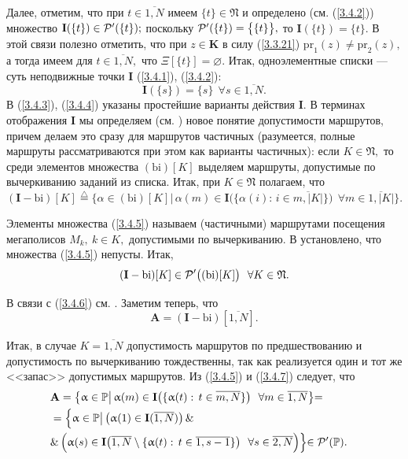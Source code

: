 \documentclass[11pt,twoside,openany]{report}
\newcommand{\bfn}{\begin{equation}}
\newcommand{\efn}{\end{equation}}
\newcommand{\df}{\stackrel{\triangle}{=}}
\newcommand{\ov}{\overline}
\newcommand{\al}{\alpha}
\newcommand{\sm}{\setminus}
\newcommand{\fa}{\forall}
\newcommand{\cp}{{\cal P}}
\newcommand{\bbp}{{\mathbb P}}
\newcommand{\emp}{\varnothing}
\begin{document}
Далее, отметим, что при
$t\in \ov{1,N}$
имеем $\{t\}\in \mathfrak{N}$ и определено (см. (\ref{3.4.2}))
множество
$\mathbf{I}(\{t\})\in \cp^\prime(\{t\});$
поскольку
$\cp^\prime(\{t\}) = \bigl\{\{t\}\bigl\},$
то $\mathbf{I}(\{t\}) = \{t\}$.
В этой связи полезно отметить, что при
$z\in \mathbf{K}$ в силу (\ref{3.3.21})
$\mathrm{pr}_1(z) \neq \mathrm{pr}_2(z),$
а тогда имеем для $t\in \ov{1,N},$ что
$\Xi[\{t\}] = \emp$.
Итак, одноэлементные списки --- суть неподвижные точки
$\mathbf{I}$ (\ref{3.4.1}), (\ref{3.4.2}):
\bfn
  \label{3.4.4}
  \mathbf{I}(\{s\}) = \{s\}\ \ \fa s\in \ov{1,N}
  .
\efn
В (\ref{3.4.3}), (\ref{3.4.4})
указаны простейшие варианты действия
$\mathbf{I}.$
В терминах отображения $\mathbf{I}$ мы определяем
(см. \cite[ч.~2]{Cha1`})
новое понятие допустимости маршрутов,
причем делаем это сразу для маршрутов частичных
(разумеется, полные маршруты рассматриваются при этом как варианты частичных):
если
$K\in \mathfrak{N},$
то среди элементов множества $(\mathrm{bi})[K]$ выделяем
маршруты, допустимые по вычеркиванию
заданий из списка.
Итак, при
$K\in \mathfrak{N}$
полагаем, что
\bfn
  \label{3.4.5}
  (\mathbf{I}- \mathrm{bi})[K] \df \bigl\{\al\in (\mathrm{bi})[K]
  \bigl|\,\al(m) \in \mathbf{I}\bigl(\{\al(i):\,i\in \ov{m,|K|}\}\bigl)\ \ \fa m\in
  \ov{1,|K|}\bigl\}
  .
\efn

Элементы множества (\ref{3.4.5})
называем (частичными) маршрутами посещения
мегаполисов
$M_k,\ k\in K,$
допустимыми по вычеркиванию.
В \cite[ч.~2]{Cha1`}
установлено, что множества (\ref{3.4.5}) непусты.
Итак,
\bfn
  \label{3.4.6}
  (\mathbf{I}- \mathrm{bi})[K] \in \cp^\prime\bigl((\mathrm{bi})
  [K]\bigl)\ \ \fa K\in  \mathfrak{N}
  .
\efn

В связи с (\ref{3.4.6})
см. \cite[предложения~2.2.2, 2.2.3]{Cha1`}.
Заметим теперь, что \cite[теорема~2.2.1]{Cha1`}
\bfn
  \label{3.4.7}
  \mathbf{A}= (\mathbf{I}-\mathrm{bi})[\ov{1,N}]
  .
\efn

Итак, в случае $K = \ov{1,N}$ допустимость маршрутов по предшествованию и
допустимость по вычеркиванию  тождественны,
так как реализуется один и тот
же <<запас>> допустимых маршрутов.
Из (\ref{3.4.5}) и (\ref{3.4.7})  следует, что
\begin{eqnarray}
  &\mathbf{A}= \bigl\{\al\in \bbp\bigl|\,\al(m) \in \mathbf{I}\bigl(\{\al(t):\,
  t\in \ov{m,N}\}\bigl)\ \ \fa m\in \ov{1,N}\bigl\} =
  &\nonumber\\
  &=\Bigl\{\al\in \bbp\bigl|\,
  \bigl(\al(1) \in \mathbf{I}(\ov{1,N})\bigl)\,\&
  &\nonumber\\
  &\&\, \Bigl(\al(s)\in \mathbf{I}\bigl(\ov{1,N}\sm \{\al(t):\,t\in \ov{1,s-1}\}
  \bigl)\ \ \fa s\in \ov{2,N}\Bigl)\Bigl\}\in \cp^\prime(\bbp)
  .
  \label{3.4.8}
\end{eqnarray}
\end{document}
